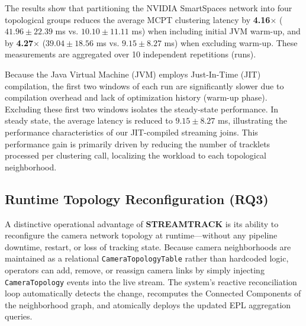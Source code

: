 \documentclass[11pt]{article}
\begin{document}
\begin{table}[H]
    \centering
    \caption{Impact of Topological Optimization: Global vs. Topology-Aware (NVIDIA SmartSpaces, 10 runs).}
    \label{tab:9camera_performance}
\end{table}

The results show that partitioning the NVIDIA SmartSpaces network into four topological groups reduces the average MCPT clustering latency by \textbf{4.16$\times$} ($41.96 \pm 22.39$ ms vs. $10.10 \pm 11.11$ ms) when including initial JVM warm-up, and by \textbf{4.27$\times$} ($39.04 \pm 18.56$ ms vs. $9.15 \pm 8.27$ ms) when excluding warm-up. These measurements are aggregated over 10 independent repetitions (runs). 

Because the Java Virtual Machine (JVM) employs Just-In-Time (JIT) compilation, the first two windows of each run are significantly slower due to compilation overhead and lack of optimization history (warm-up phase). Excluding these first two windows isolates the steady-state performance. In steady state, the average latency is reduced to $9.15 \pm 8.27$ ms, illustrating the performance characteristics of our JIT-compiled streaming joins. This performance gain is primarily driven by reducing the number of tracklets processed per clustering call, localizing the workload to each topological neighborhood.

\subsection{Runtime Topology Reconfiguration (RQ3)}

A distinctive operational advantage of \textbf{STREAMTRACK} is its ability to reconfigure the camera network topology at runtime---without any pipeline downtime, restart, or loss of tracking state. Because camera neighborhoods are maintained as a relational \texttt{CameraTopologyTable} rather than hardcoded logic, operators can add, remove, or reassign camera links by simply injecting \texttt{CameraTopology} events into the live stream. The system's reactive reconciliation loop automatically detects the change, recomputes the Connected Components of the neighborhood graph, and atomically deploys the updated EPL aggregation queries.
\end{document}
